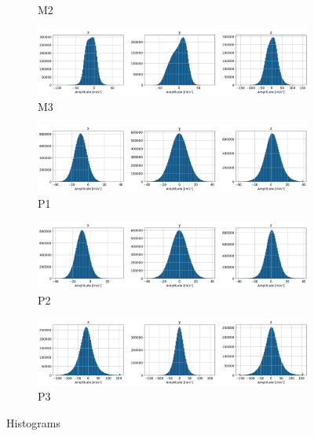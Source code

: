 \begin{figure}[h]
\begin{subfigure}[b]{0.33\textwidth}
        \caption{M2}
    \end{subfigure} 
    \hfill
    \begin{subfigure}[b]{0.33\textwidth}
        \includegraphics[width=\textwidth]{assets/results/histograms/M3.png}
        \caption{M3}
    \end{subfigure}
    \hfill
    \begin{subfigure}[b]{0.33\textwidth}
        \includegraphics[width=\textwidth]{assets/results/histograms/P1.png}
        \caption{P1}
    \end{subfigure}
    \hfill
    \begin{subfigure}[b]{0.33\textwidth}
        \includegraphics[width=\textwidth]{assets/results/histograms/P2.png}
        \caption{P2}
    \end{subfigure} 
    \hfill
    \begin{subfigure}[b]{0.33\textwidth}
        \includegraphics[width=\textwidth]{assets/results/histograms/P3.png}
        \caption{P3}
    \end{subfigure} 
    \caption{Histograms}
\end{figure}

